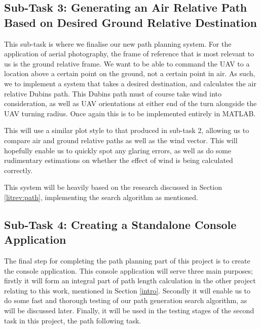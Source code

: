 \subsection{Sub-Task 3: Generating an Air Relative Path Based on Desired Ground Relative Destination}
\label{task1:design:subtask3}

This sub-task is where we finalise our new path planning system. For the application of aerial photography, the frame of reference that is most relevant to us is the ground relative frame. We want to be able to command the UAV to a location above a certain point on the ground, not a certain point in air. As such, we to implement a system that takes a desired destination, and calculates the air relative Dubins path. This Dubins path must of course take wind into consideration, as well as UAV orientations at either end of the turn alongside the UAV turning radius. Once again this is to be implemented entirely in MATLAB. 

This will use a similar plot style to that produced in sub-task 2, allowing us to compare air and ground relative paths as well as the wind vector. This will hopefully enable us to quickly spot any glaring errors, as well as do some rudimentary estimations on whether the effect of wind is being calculated correctly.

This system will be heavily based on the research discussed in Section \ref{litrev:path}, implementing the search algorithm as mentioned.

\subsection{Sub-Task 4: Creating a Standalone Console Application}
\label{task1:design:subtask4}

The final step for completing the path planning part of this project is to create the console application. This console application will serve three main purposes; firstly it will form an integral part of path length calculation in the other project relating to this work, mentioned in Section \ref{intro}. Secondly it will enable us to do some fast and thorough testing of our path generation search algorithm, as will be discussed later. Finally, it will be used in the testing stages of the second task in this project, the path following task.

